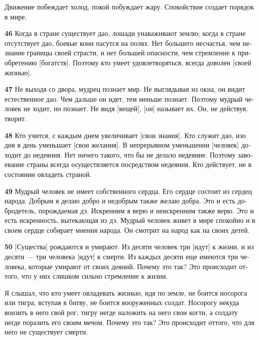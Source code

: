 \documentclass[a4paper]{article}
\begin{document}
{
Движение побеждает холод, покой побуждает жару. Спокойствие создает порядок в мире.}

{\ttfamily
\foreignlanguage{russian}{\textrm{\textbf{46}}}\foreignlanguage{russian}{\textrm{ Когда в стране существует дао, лошади
унаваживают землю; когда в стране отсутствует дао, боевые кони пасутся на полях. Нет большего несчастья, чем незнание
границы своей страсти, и нет большей опасности, чем стремление к приобретению [богатств]. Поэтому кто умеет
удовлетворяться, всегда доволен [своей жизнью].}}}

{\ttfamily
\foreignlanguage{russian}{\textrm{\textbf{47}}}\foreignlanguage{russian}{\textrm{ Не выходя со двора, мудрец познает
мир. Не выглядывая из окна, он видит естественное дао. Чем дальше он идет, тем меньше познает. Поэтому мудрый человек
не ходит, но познает. Не видя [вещей], [он] называет их. Он, не действуя, творит.}}}

{\ttfamily
\foreignlanguage{russian}{\textrm{\textbf{48}}}\foreignlanguage{russian}{\textrm{ Кто учится, с каждым днем увеличивает
[свои знания]. Кто служит дао, изо дня в день уменьшает [свои желания]. В непрерывном уменьшении [человек] доходит до
недеяния. Нет ничего такого, что бы не делало недеяние. Поэтому завоевание страны всегда осуществляется посредством
недеяния. Кто действует, не в состоянии овладеть страной.}}}

{\ttfamily
\foreignlanguage{russian}{\textrm{\textbf{49}}}\foreignlanguage{russian}{\textrm{ Мудрый человек не имеет собственного
сердца. Его сердце состоит из сердец народа. Добрым я делаю добро и недобрым также желаю добра. Это и есть добродетель,
порождаемая дэ. Искренним я верю и неискренним также верю. Это и есть искренность, вытекающая из дэ. Мудрый человек
живет в мире спокойно и в своем сердце собирает мнения народа. Он смотрит на народ как на своих детей.}}}

{\ttfamily
\foreignlanguage{russian}{\textrm{\textbf{50}}}\foreignlanguage{russian}{\textrm{ [Существа] рождаются и умирают. Из
десяти человек три [идут] к жизни, и из десяти — три человека [идут] к смерти. Из каждых десяти еще имеются три
человека, которые умирают от своих деяний. Почему это так? Это происходит оттого, что у них слишком сильно стремление к
жизни.}}}

{
Я слышал, что кто умеет овладевать жизнью, идя по земле, не боится носорога или тигра, вступая в битву, не боится
вооруженных солдат. Носорогу некуда вонзить в него свой рог, тигру негде наложить на него свои когти, а солдату негде
поразить его своим мечом. Почему это так? Это происходит оттого, что для него не существует смерти.}
\end{document}
